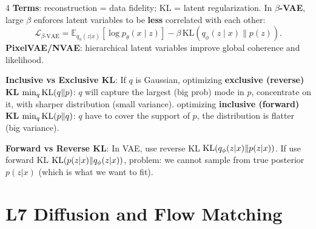 \documentclass{article}
\newcommand{\key}[1]{\textbf{#1}}
\newcommand{\E}{\mathbb{E}}
\newcommand{\KL}{\mathrm{KL}}
\newcommand{\1}{\mathbf 1}
\begin{document}
\begin{multicols*}{4}
\key{Terms}: reconstruction = data fidelity; KL = latent regularization. In \key{$\beta$-VAE}, large $\beta$ enforces latent variables to be \key{less} correlated with each other:
\[
\mathcal L_{\beta\text{-VAE}}
=\E_{q_\phi(z|x)}[\log p_\theta(x\mid z)]
-\beta\,\KL(q_\phi(z\mid x)\|p(z)).
\]
\key{PixelVAE/NVAE}: hierarchical latent variables improve global coherence and likelihood.

\key{Inclusive vs Exclusive KL}:
If $q$ is Gaussian, 
optimizing \key{exclusive (reverse) KL} $\min_q {\rm KL}(q\|p)$: $q$ will capture the largest (big prob) mode in $p$, concentrate on it, with sharper distribution (small variance). 
optimizing \key{inclusive (forward) KL} $\min_q {\rm KL}(p\|q)$: $q$ have to cover the support of $p$, the distribution is flatter (big variance). 

\key{Forward vs Reverse KL}:
In VAE, use reverse KL ${\rm KL}(q_\phi(z|x)\|p(z|x))$. If use forward KL ${\rm KL}(p(z|x)\|q_\phi(z|x))$, problem: we cannot sample from true posterior $p(z|x)$ (which is what we want to fit). 


\section{L7 Diffusion and Flow Matching}

\end{multicols*}
\end{document}
